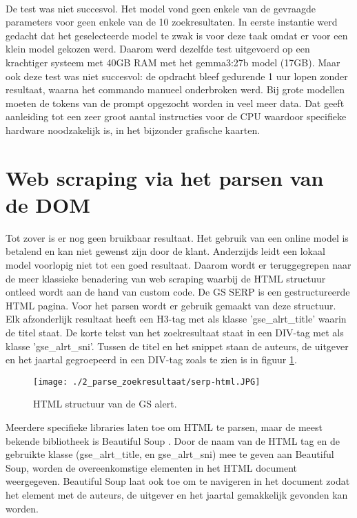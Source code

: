 \\
De test was niet succesvol. Het model vond geen enkele van de gevraagde parameters voor geen enkele van de 10 zoekresultaten.
In eerste instantie werd gedacht dat het geselecteerde model te zwak is voor deze taak omdat er voor een klein model gekozen werd. Daarom werd dezelfde test uitgevoerd op een krachtiger systeem met 40GB RAM met het gemma3:27b model (17GB). Maar ook deze test was niet succesvol: de opdracht bleef gedurende 1 uur lopen zonder resultaat, waarna het commando manueel onderbroken werd. Bij grote modellen moeten de tokens van de prompt opgezocht worden in veel meer data. Dat geeft aanleiding tot een zeer groot aantal instructies voor de CPU waardoor specifieke hardware noodzakelijk is, in het bijzonder grafische kaarten. 
\section{Web scraping via het parsen van de DOM}
Tot zover is er nog geen bruikbaar resultaat. Het gebruik van een online model is betalend en kan niet gewenst zijn door de klant. Anderzijds leidt een lokaal model voorlopig niet tot een goed resultaat. Daarom wordt er teruggegrepen naar de meer klassieke benadering van web scraping waarbij de HTML structuur ontleed wordt aan de hand van custom code.
De GS SERP is een gestructureerde HTML pagina. Voor het parsen wordt er gebruik gemaakt van deze structuur.
Elk afzonderlijk resultaat heeft een H3-tag met als klasse 'gse\_alrt\_title' waarin de titel staat. De korte tekst van het zoekresultaat staat in een DIV-tag met als klasse 'gse\_alrt\_sni'. Tussen de titel en het snippet staan de auteurs, de uitgever en het jaartal gegroepeerd in een DIV-tag zoals te zien is in figuur \ref{fig:serp_html}.
\begin{figure}[h!]
    \centering
    \texttt{[image: ./2\_parse\_zoekresultaat/serp-html.JPG]}
    \caption[HTML structuur van de GS alert.]{\label{fig:serp_html}HTML structuur van de GS alert.}
\end{figure}
\FloatBarrier
Meerdere specifieke libraries laten toe om HTML te parsen, maar de meest bekende bibliotheek is Beautiful Soup \autocite{Soup2025}. Door de naam van de HTML tag en de gebruikte klasse (gse\_alrt\_title, en gse\_alrt\_sni) mee te geven aan Beautiful Soup, worden de overeenkomstige elementen in het HTML document weergegeven. Beautiful Soup laat ook toe om te navigeren in het document zodat het element met de auteurs, de uitgever en het jaartal gemakkelijk gevonden kan worden.\\
